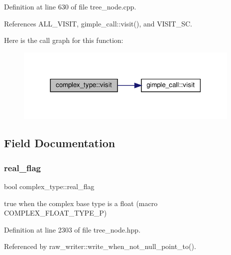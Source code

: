 Definition at line 630 of file tree\+\_\+node.\+cpp.



References A\+L\+L\+\_\+\+V\+I\+S\+IT, gimple\+\_\+call\+::visit(), and V\+I\+S\+I\+T\+\_\+\+SC.

Here is the call graph for this function\+:
\nopagebreak
\begin{figure}[H]
\begin{center}
\leavevmode
\includegraphics[width=306pt]{df/d76/structcomplex__type_a22e4557b10d89aad537a1d213bf5eafd_cgraph}
\end{center}
\end{figure}


\subsection{Field Documentation}
\mbox{\label{structcomplex__type_a1c4d62bd1a77d167c39a89382d15f5ac}} 
\subsubsection{\texorpdfstring{real\+\_\+flag}{real\_flag}}
{\footnotesize\ttfamily bool complex\+\_\+type\+::real\+\_\+flag}



true when the complex base type is a float (macro C\+O\+M\+P\+L\+E\+X\+\_\+\+F\+L\+O\+A\+T\+\_\+\+T\+Y\+P\+E\+\_\+P) 



Definition at line 2303 of file tree\+\_\+node.\+hpp.



Referenced by raw\+\_\+writer\+::write\+\_\+when\+\_\+not\+\_\+null\+\_\+point\+\_\+to().

\mbox{\label{structcomplex__type_abbbe2c5acf95c1c11bcba1de6941a1d1}} 
